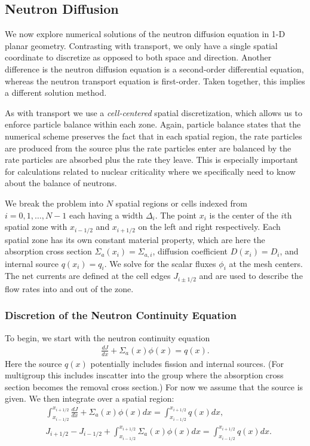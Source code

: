 \subsection{Neutron Diffusion}

We now explore numerical solutions of the neutron diffusion equation in 1-D planar geometry. Contrasting with transport, we only have a single spatial coordinate to discretize as opposed to both space and direction. Another difference is the neutron diffusion equation is a second-order differential equation, whereas the neutron transport equation is first-order. Taken together, this implies a different solution method.

As with transport we use a \emph{cell-centered} spatial discretization, which allows us to enforce particle balance within each zone. Again, particle balance states that the numerical scheme preserves the fact that in each spatial region, the rate particles are produced from the source plus the rate particles enter are balanced by the rate particles are absorbed plus the rate they leave. This is especially important for calculations related to nuclear criticality where we specifically need to know about the balance of neutrons. 

We break the problem into $N$ spatial regions or cells indexed from $i = 0, 1, \ldots, N-1$ each having a width $\Delta_i$. The point $x_i$ is the center of the $i$th spatial zone with $x_{i-1/2}$ and $x_{i+1/2}$ on the left and right respectively. Each spatial zone has its own constant material property, which are here the absorption cross section $\Sigma_{a}(x_i) = \Sigma_{a,i}$, diffusion coefficient $D(x_i) = D_i$, and internal source $q(x_i) = q_i$. We solve for the scalar fluxes $\phi_i$ at the mesh centers. The net currents are defined at the cell edges $J_{i \pm 1/2}$ and are used to describe the flow rates into and out of the zone. 

\subsubsection{Discretion of the Neutron Continuity Equation}

To begin, we start with the neutron continuity equation
\begin{align}
  \frac{dJ}{dx} + \Sigma_a(x) \phi(x) = q(x) .
\end{align}
Here the source $q(x)$ potentially includes fission and internal sources. (For multigroup this includes inscatter into the group where the absorption cross section becomes the removal cross section.) For now we assume that the source is given. We then integrate over a spatial region:
\begin{align}
  &\int_{x_{i-1/2}}^{x_{i+1/2}} \frac{dJ}{dx} + \Sigma_a(x) \phi(x) dx = \int_{x_{i-1/2}}^{x_{i+1/2}} q(x) dx, \nonumber \\
  &J_{i+1/2} - J_{i-1/2} + \int_{x_{i-1/2}}^{x_{i+1/2}} \Sigma_a(x) \phi(x) dx = \int_{x_{i-1/2}}^{x_{i+1/2}} q(x) dx .
\end{align}

